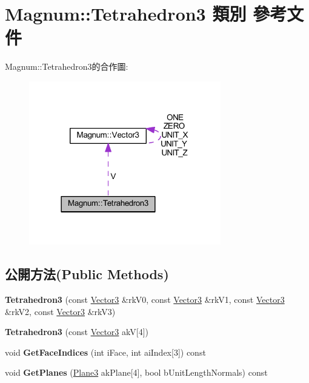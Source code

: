 \hypertarget{class_magnum_1_1_tetrahedron3}{}\section{Magnum\+:\+:Tetrahedron3 類別 參考文件}
\label{class_magnum_1_1_tetrahedron3}


Magnum\+:\+:Tetrahedron3的合作圖\+:\nopagebreak
\begin{figure}[H]
\begin{center}
\leavevmode
\includegraphics[width=237pt]{class_magnum_1_1_tetrahedron3__coll__graph}
\end{center}
\end{figure}
\subsection*{公開方法(Public Methods)}
\begin{DoxyCompactItemize}
\item 
{\bfseries Tetrahedron3} (const \hyperlink{class_magnum_1_1_vector3}{Vector3} \&rk\+V0, const \hyperlink{class_magnum_1_1_vector3}{Vector3} \&rk\+V1, const \hyperlink{class_magnum_1_1_vector3}{Vector3} \&rk\+V2, const \hyperlink{class_magnum_1_1_vector3}{Vector3} \&rk\+V3)\hypertarget{class_magnum_1_1_tetrahedron3_af20977691015e686607e29b03976db08}{}\label{class_magnum_1_1_tetrahedron3_af20977691015e686607e29b03976db08}

\item 
{\bfseries Tetrahedron3} (const \hyperlink{class_magnum_1_1_vector3}{Vector3} akV\mbox{[}4\mbox{]})\hypertarget{class_magnum_1_1_tetrahedron3_a2712664a682414b5661d803853634b45}{}\label{class_magnum_1_1_tetrahedron3_a2712664a682414b5661d803853634b45}

\item 
void {\bfseries Get\+Face\+Indices} (int i\+Face, int ai\+Index\mbox{[}3\mbox{]}) const \hypertarget{class_magnum_1_1_tetrahedron3_aedd6eff8a2df7cb55d7e3104b415f549}{}\label{class_magnum_1_1_tetrahedron3_aedd6eff8a2df7cb55d7e3104b415f549}

\item 
void {\bfseries Get\+Planes} (\hyperlink{class_magnum_1_1_plane3}{Plane3} ak\+Plane\mbox{[}4\mbox{]}, bool b\+Unit\+Length\+Normals) const \hypertarget{class_magnum_1_1_tetrahedron3_af4c35aec7d8ade1247611f3c2cd0e1e8}{}\label{class_magnum_1_1_tetrahedron3_af4c35aec7d8ade1247611f3c2cd0e1e8}

\end{DoxyCompactItemize}
